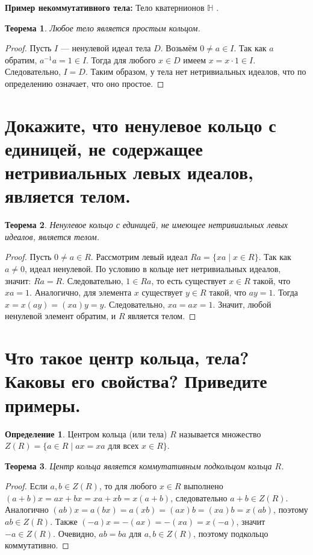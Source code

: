 \documentclass[12pt, a4paper]{article}
\theoremstyle{definition}
\newtheorem{definition}{Определение}[section]
\theoremstyle{plain}
\newtheorem{theorem}{Теорема}[section]
\begin{document}
	\textbf{Пример некоммутативного тела:} Тело кватернионов $\mathbb{H}$ .
	
	\begin{theorem}
		Любое тело является простым кольцом.
	\end{theorem}
	\begin{proof}
		Пусть $I$ — ненулевой идеал тела $D$. Возьмём $0 \neq a \in I$. Так как $a$ обратим, $a^{-1}a = 1 \in I$. Тогда для любого $x \in D$ имеем $x = x \cdot 1 \in I$. Следовательно, $I = D$. Таким образом, у тела нет нетривиальных идеалов, что по определению означает, что оно простое.
	\end{proof}
	
	\newpage
	\section{Докажите, что ненулевое кольцо с единицей, не содержащее нетривиальных левых идеалов, является телом.}
	
	\begin{theorem}
		Ненулевое кольцо с единицей, не имеющее нетривиальных левых идеалов, является телом.
	\end{theorem}
	\begin{proof}
		Пусть $0 \neq a \in R$. Рассмотрим левый идеал $Ra = \{xa \mid x \in R\}$. Так как $a \neq 0$, идеал ненулевой. По условию в кольце нет нетривиальных идеалов, значит: $Ra = R$. 
		Следовательно, $1 \in Ra$, то есть существует $x \in R$ такой, что $xa = 1$. 
		Аналогично, для элемента $x$ существует $y \in R$ такой, что $ay = 1$. 
		Тогда $x = x(ay) = (xa)y = y$. Следовательно, $xa = ax = 1$. Значит, любой ненулевой элемент обратим, и $R$ является телом.
	\end{proof}
	
	\newpage
	\section{Что такое центр кольца, тела? Каковы его свойства? Приведите примеры.}
	
	\begin{definition}
		Центром кольца (или тела) $R$ называется множество $Z(R) = \{a \in R \mid ax = xa \text{ для всех } x \in R\}$.
	\end{definition}
	
	\begin{theorem}
		Центр кольца является коммутативным подкольцом кольца $R$.
	\end{theorem}
	\begin{proof}
		Если $a, b \in Z(R)$, то для любого $x \in R$ выполнено $(a+b)x = ax+bx = xa+xb = x(a+b)$, следовательно $a+b \in Z(R)$. 
		Аналогично $(ab)x = a(bx) = a(xb) = (ax)b = (xa)b = x(ab)$, поэтому $ab \in Z(R)$. 
		Также $(-a)x = -(ax) = -(xa) = x(-a)$, значит $-a \in Z(R)$. Очевидно, $ab=ba$ для $a,b \in Z(R)$, поэтому подкольцо коммутативно.
	\end{proof}
	
\end{document}
